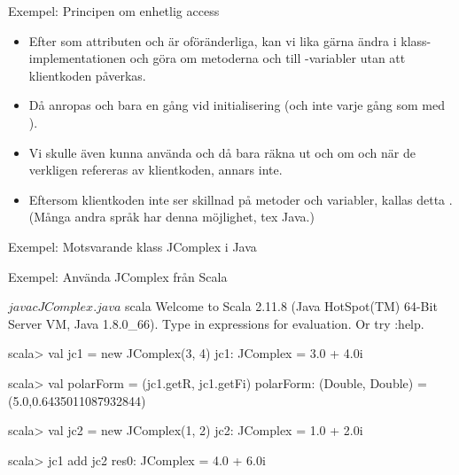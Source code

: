 \begin{Slide}{Exempel: Principen om enhetlig access}\SlideFontSmall
{}
\pause
\begin{itemize}
\item Efter som attributen  och  är oföränderliga, kan vi lika gärna ändra i klass-implementationen och göra om metoderna  och  till -variabler utan att klientkoden påverkas. 

\item Då anropas  och  bara en gång vid initialisering (och inte varje gång som med ).

\item Vi skulle även kunna använda  och då bara räkna ut  och  om och när de verkligen refereras av klientkoden, annars inte.

\item Eftersom klientkoden inte ser skillnad på metoder och variabler, kallas detta . (Många andra språk har  denna möjlighet, tex Java.)

\end{itemize}

\end{Slide}


\begin{Slide}{Exempel: Motsvarande klass JComplex i Java}\SlideFontSmall
{}
\end{Slide}

\begin{Slide}{Exempel: Använda JComplex från Scala}
\begin{REPL}
$ javac JComplex.java 
$ scala
Welcome to Scala 2.11.8 (Java HotSpot(TM) 64-Bit Server VM, Java 1.8.0_66).
Type in expressions for evaluation. Or try :help.

scala> val jc1 = new JComplex(3, 4)
jc1: JComplex = 3.0 + 4.0i

scala> val polarForm = (jc1.getR, jc1.getFi)
polarForm: (Double, Double) = (5.0,0.6435011087932844)

scala> val jc2 = new JComplex(1, 2)
jc2: JComplex = 1.0 + 2.0i

scala> jc1 add jc2
res0: JComplex = 4.0 + 6.0i
\end{REPL}
\end{Slide}


